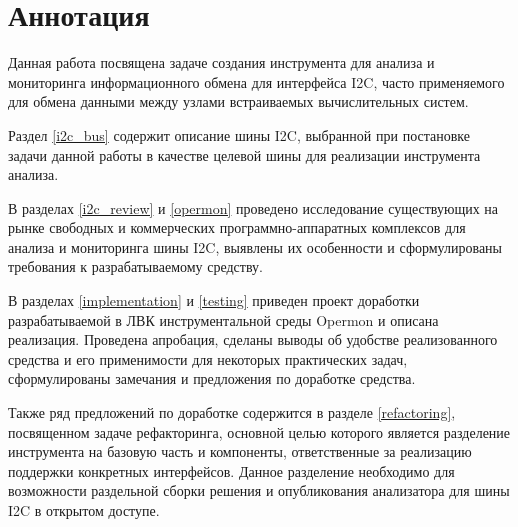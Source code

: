 \section*{Аннотация}

Данная работа посвящена задаче создания инструмента для анализа и мониторинга информационного обмена для интерфейса I2C, часто применяемого для обмена данными между узлами встраиваемых вычислительных систем.

Раздел \ref{i2c_bus} содержит описание шины I2C, выбранной при постановке задачи данной работы в качестве целевой шины для реализации инструмента анализа.

В разделах \ref{i2c_review} и \ref{opermon} проведено исследование существующих на рынке свободных и коммерческих программно-аппаратных комплексов для анализа и мониторинга шины I2C, выявлены их особенности и сформулированы требования к разрабатываемому средству.

В разделах \ref{implementation} и \ref{testing} приведен проект доработки разрабатываемой в ЛВК инструментальной среды Opermon и описана реализация. Проведена апробация, сделаны выводы об удобстве реализованного средства и его применимости для некоторых практических задач, сформулированы замечания и предложения по доработке средства.

Также ряд предложений по доработке содержится в разделе \ref{refactoring}, посвященном задаче рефакторинга, основной целью которого является разделение инструмента на базовую часть и компоненты, ответственные за реализацию поддержки конкретных интерфейсов. Данное разделение необходимо для возможности раздельной сборки решения и опубликования анализатора для шины I2C в открытом доступе.

